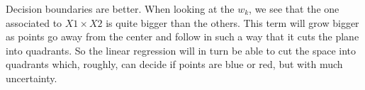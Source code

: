 \documentclass{article}
\begin{document}
Decision boundaries are better.
When looking at the $w_k$, we see that the one associated to $X1 \times X2$ is quite bigger than the others. This term will grow bigger as points go away from the center and follow in such a way that it cuts the plane into quadrants. So the linear regression will in turn be able to cut the space into quadrants which, roughly, can decide if points are blue or red, but with much uncertainty.

\end{document}
